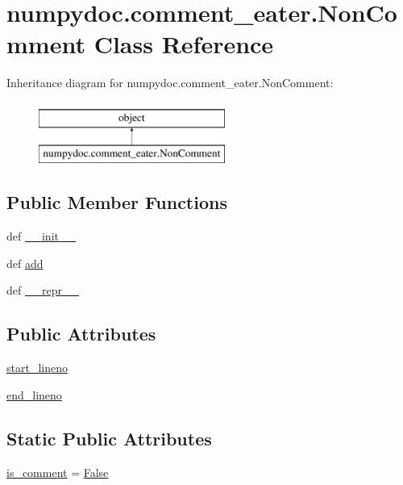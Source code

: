 \hypertarget{classnumpydoc_1_1comment__eater_1_1NonComment}{}\section{numpydoc.\+comment\+\_\+eater.\+Non\+Comment Class Reference}
\label{classnumpydoc_1_1comment__eater_1_1NonComment}
Inheritance diagram for numpydoc.\+comment\+\_\+eater.\+Non\+Comment\+:\begin{figure}[H]
\begin{center}
\leavevmode
\includegraphics[height=2.000000cm]{classnumpydoc_1_1comment__eater_1_1NonComment}
\end{center}
\end{figure}
\subsection*{Public Member Functions}
\begin{DoxyCompactItemize}
\item 
def \hyperlink{classnumpydoc_1_1comment__eater_1_1NonComment_aaaa34218ac36f75d322d7adc14ce5869}{\+\_\+\+\_\+init\+\_\+\+\_\+}
\item 
def \hyperlink{classnumpydoc_1_1comment__eater_1_1NonComment_a712cd14fc0ce31cf76e75ee08ca88b63}{add}
\item 
def \hyperlink{classnumpydoc_1_1comment__eater_1_1NonComment_acf17734cf864b8b17e5b82515c06a5a1}{\+\_\+\+\_\+repr\+\_\+\+\_\+}
\end{DoxyCompactItemize}
\subsection*{Public Attributes}
\begin{DoxyCompactItemize}
\item 
\hyperlink{classnumpydoc_1_1comment__eater_1_1NonComment_a4c1284415a9ccb0a3a0782ee74f048db}{start\+\_\+lineno}
\item 
\hyperlink{classnumpydoc_1_1comment__eater_1_1NonComment_a580afee41136862402478060a0269e64}{end\+\_\+lineno}
\end{DoxyCompactItemize}
\subsection*{Static Public Attributes}
\begin{DoxyCompactItemize}
\item 
\hyperlink{classnumpydoc_1_1comment__eater_1_1NonComment_ae98428ac24b7cfa2735ee5f15eaefb3a}{is\+\_\+comment} = \hyperlink{libqhull_8h_a306ebd41c0cd1303b1372c6153f0caf8}{False}
\end{DoxyCompactItemize}



